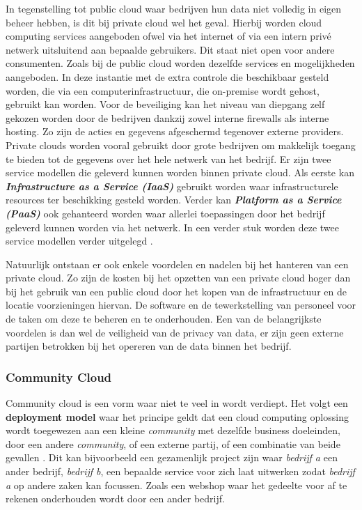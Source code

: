 In tegenstelling tot public cloud waar bedrijven hun data niet volledig in eigen beheer hebben, is dit bij private cloud wel het geval. Hierbij worden cloud computing services aangeboden ofwel via het internet of via een intern privé netwerk uitsluitend aan bepaalde gebruikers. Dit staat niet open voor andere consumenten. Zoals bij de public cloud worden dezelfde services en mogelijkheden aangeboden. In deze instantie met de extra controle die beschikbaar gesteld worden, die via een computerinfrastructuur, die on-premise wordt gehost, gebruikt kan worden. Voor de beveiliging kan het niveau van diepgang zelf gekozen worden door de bedrijven dankzij zowel interne firewalls als interne hosting. Zo zijn de acties en gegevens afgeschermd tegenover externe providers. Private clouds worden vooral gebruikt door grote bedrijven om makkelijk toegang te bieden tot de gegevens over het hele netwerk van het bedrijf. Er zijn twee service modellen die geleverd kunnen worden binnen private cloud. Als eerste kan \textbf{\textit{Infrastructure as a Service (IaaS)}} gebruikt worden waar infrastructurele resources ter beschikking gesteld worden. Verder kan \textbf{\textit{Platform as a Service (PaaS)}} ook gehanteerd worden waar allerlei toepassingen door het bedrijf geleverd kunnen worden via het netwerk. In een verder stuk worden deze twee service modellen verder uitgelegd \autocite{MicrosoftAzurePrivateCloud} \autocite{cbtnuggets_2019} \autocite{goyal2014public}.

Natuurlijk ontstaan er ook enkele voordelen en nadelen bij het hanteren van een private cloud. Zo zijn de kosten bij het opzetten van een private cloud hoger dan bij het gebruik van een public cloud door het kopen van de infrastructuur en de locatie voorzieningen hiervan. De software en de tewerkstelling van personeel voor de taken om deze te beheren en te onderhouden. Een van de belangrijkste voordelen is dan wel de veiligheid van de privacy van data, er zijn geen externe partijen betrokken bij het opereren van de data binnen het bedrijf.

\subsubsection{Community Cloud}

Community cloud is een vorm waar niet te veel in wordt verdiept. Het volgt een \textbf{deployment model} waar het principe geldt dat een cloud computing oplossing wordt toegewezen aan een kleine \textit{community} met dezelfde business doeleinden, door een andere \textit{community}, of een externe partij, of een combinatie van beide gevallen \autocite{jimenez2013supporting}. Dit kan bijvoorbeeld een gezamenlijk project zijn waar \textit{bedrijf a} een ander bedrijf, \textit{bedrijf b}, een bepaalde service voor zich laat uitwerken zodat \textit{bedrijf a} op andere zaken kan focussen. Zoals een webshop waar het gedeelte voor af te rekenen onderhouden wordt door een ander bedrijf.


